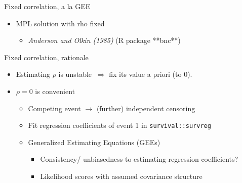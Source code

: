 \documentclass[10pt]{beamer}
\providecommand{\tightlist}{%
\setlength{\itemsep}{0pt}\setlength{\parskip}{0pt}}
\begin{document}
\begin{frame}[fragile]{Fixed correlation, a la GEE}
\protect\hypertarget{fixed-correlation-a-la-gee}{}

\begin{itemize}
\tightlist
\item
  MPL solution with rho fixed
  \begin{itemize}
      \item \textit{Anderson and Olkin (1985)} (R package **bnc**)
  \end{itemize}
\end{itemize}




\begin{block}{Fixed correlation, rationale}

\begin{itemize}
\tightlist
\item
  Estimating \(\rho\) is unstable \(\ \Rightarrow\) fix its value a priori (to 0).
\item
  \(\rho=0\) is convenient

  \begin{itemize}
  \tightlist
  \item
    Competing event \(\to\) (further) independent censoring
  \item
    Fit regression coefficients of event 1 in
    \texttt{survival::survreg}
  \item
    Generalized Estimating Equations (GEEs)

    \begin{itemize}
    \tightlist
    \item
      Consistency/ unbiasedness to estimating regression coefficients?
    \item
      Likelihood scores with assumed covariance structure
    \end{itemize}
  \end{itemize}
\end{itemize}
\end{block}

\end{frame}
\end{document}
